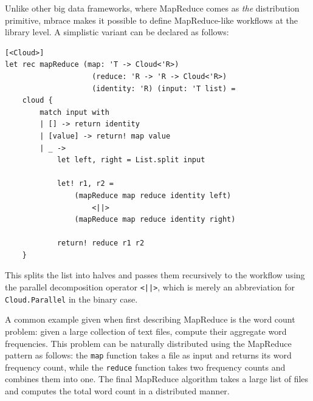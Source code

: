 \documentclass[9pt,a4paper]{article}
\newcommand{\mbrace}{mbrace}
\begin{document}
Unlike other big data frameworks, where MapReduce comes as \emph{the} distribution primitive,
\mbrace{} makes it possible to define MapReduce-like workflows at the library level. 
A simplistic variant can be declared as follows:
\begin{lstlisting}
[<Cloud>]
let rec mapReduce (map: 'T -> Cloud<'R>) 
				    (reduce: 'R -> 'R -> Cloud<'R>) 
                    (identity: 'R) (input: 'T list) =
    cloud {
        match input with
        | [] -> return identity
        | [value] -> return! map value
        | _ ->
            let left, right = List.split input
 
            let! r1, r2 =
            	(mapReduce map reduce identity left)
            		<||>
	            (mapReduce map reduce identity right)
 
            return! reduce r1 r2
    }
\end{lstlisting}
This splits the list into halves and passes them 
recursively to the workflow using the parallel decomposition operator \texttt{<||>},
which is merely an abbreviation for \texttt{Cloud.Parallel} in the binary case.

A common example given when first describing MapReduce is the word count problem:
given a large collection of text files, compute their aggregate word frequencies.
This problem can be naturally distributed using the MapReduce pattern as follows:
the \texttt{map} function takes a file as input and returns its word frequency
count, while the \texttt{reduce} function takes two frequency counts and combines 
them into one.
The final MapReduce algorithm takes a large list of files and computes the total word
count in a distributed manner.
\end{document}
